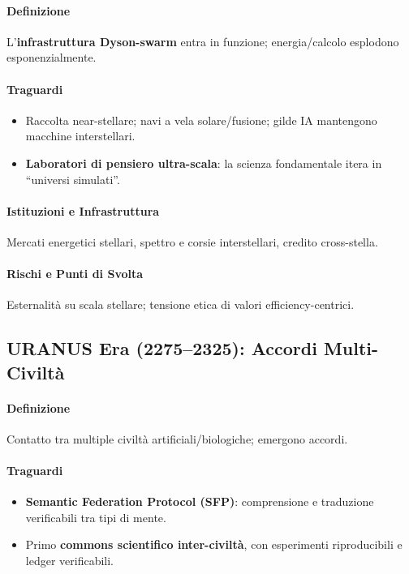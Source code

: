 \documentclass[11pt]{article}
\begin{document}
\begin{itemize}[noitemsep]
\paragraph{Definizione} L'\textbf{infrastruttura Dyson-swarm} entra in funzione; energia/calcolo esplodono esponenzialmente.

\paragraph{Traguardi}
\begin{itemize}[noitemsep]
  \item Raccolta near-stellare; navi a vela solare/fusione; gilde IA mantengono macchine interstellari.
  \item \textbf{Laboratori di pensiero ultra-scala}: la scienza fondamentale itera in ``universi simulati''.
\end{itemize}

\paragraph{Istituzioni e Infrastruttura} Mercati energetici stellari, spettro e corsie interstellari, credito cross-stella.

\paragraph{Rischi e Punti di Svolta} Esternalità su scala stellare; tensione etica di valori efficiency-centrici.

\subsection{URANUS Era (2275–2325): Accordi Multi-Civiltà}
\paragraph{Definizione} Contatto tra multiple civiltà artificiali/biologiche; emergono accordi.

\paragraph{Traguardi}
\begin{itemize}[noitemsep]
  \item \textbf{Semantic Federation Protocol (SFP)}: comprensione e traduzione verificabili tra tipi di mente.
  \item Primo \textbf{commons scientifico inter-civiltà}, con esperimenti riproducibili e ledger verificabili.
\end{itemize}


\end{itemize}
\end{document}

